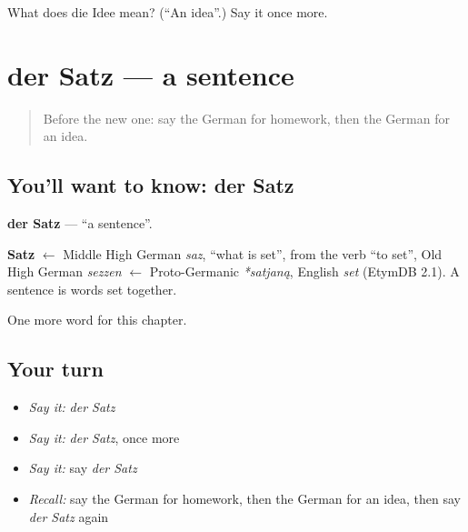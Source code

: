 \begin{tcolorbox}[breakable,colback=teal!4,colframe=teal!35!black,title={Before you move on}]
What does die Idee mean? (\textquotedblleft{}An idea\textquotedblright{}.) Say it once more.
\end{tcolorbox}
\section[der Satz]{der Satz — a sentence}

\label{lesson:GE-C128-satz}



\begin{quote}
Before the new one: say the German for homework, then the German for an idea.
\end{quote}

\subsection*{You'll want to know: der Satz}
\textbf{der Satz} — \textquotedblleft{}a sentence\textquotedblright{}.

\begin{cousinweb}
\textbf{Satz} $\leftarrow$ Middle High German \emph{saz}, \textquotedblleft{}what is set\textquotedblright{}, from the verb \textquotedblleft{}to set\textquotedblright{}, Old High German \emph{sezzen} $\leftarrow$ Proto-Germanic \emph{*satjaną}, English \emph{set} (EtymDB 2.1). A sentence is words set together.
\end{cousinweb}

\begin{grammarlens}[title={What you've built}]
One more word for this chapter.
\end{grammarlens}

\subsection*{Your turn}
\begin{itemize}
\raggedright
  \item \emph{Say it:} \emph{der Satz}
  \item \emph{Say it:} \emph{der Satz}, once more
  \item \emph{Say it:} say \emph{der Satz}
  \item \emph{Recall:} say the German for homework, then the German for an idea, then say \emph{der Satz} again
\end{itemize}

